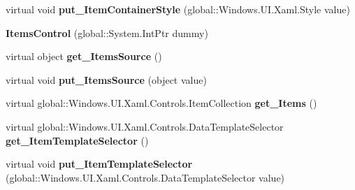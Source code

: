 \begin{DoxyCompactItemize}
\item 
\mbox{\label{class_windows_1_1_u_i_1_1_xaml_1_1_controls_1_1_items_control_a22e6b11c11e2306e3c13c1294b698d47}} 
virtual void {\bfseries put\+\_\+\+Item\+Container\+Style} (global\+::\+Windows.\+U\+I.\+Xaml.\+Style value)
\item 
\mbox{\label{class_windows_1_1_u_i_1_1_xaml_1_1_controls_1_1_items_control_a2a23be568a479e115892800d6b88b77a}} 
{\bfseries Items\+Control} (global\+::\+System.\+Int\+Ptr dummy)
\item 
\mbox{\label{class_windows_1_1_u_i_1_1_xaml_1_1_controls_1_1_items_control_ada6978b5b6da9e42647e7bbae2efa4d9}} 
virtual object {\bfseries get\+\_\+\+Items\+Source} ()
\item 
\mbox{\label{class_windows_1_1_u_i_1_1_xaml_1_1_controls_1_1_items_control_aeea26f9c774f2e66be28cffd70420e8c}} 
virtual void {\bfseries put\+\_\+\+Items\+Source} (object value)
\item 
\mbox{\label{class_windows_1_1_u_i_1_1_xaml_1_1_controls_1_1_items_control_a5f5a8f9fc3aafc90d6f7e7ad33f58698}} 
virtual global\+::\+Windows.\+U\+I.\+Xaml.\+Controls.\+Item\+Collection {\bfseries get\+\_\+\+Items} ()
\item 
\mbox{\label{class_windows_1_1_u_i_1_1_xaml_1_1_controls_1_1_items_control_a9959b8e62f370e00b7c5ba03c1735a6c}} 
virtual global\+::\+Windows.\+U\+I.\+Xaml.\+Controls.\+Data\+Template\+Selector {\bfseries get\+\_\+\+Item\+Template\+Selector} ()
\item 
\mbox{\label{class_windows_1_1_u_i_1_1_xaml_1_1_controls_1_1_items_control_aa9c0c0db76f9d77b78c08b022e500e90}} 
virtual void {\bfseries put\+\_\+\+Item\+Template\+Selector} (global\+::\+Windows.\+U\+I.\+Xaml.\+Controls.\+Data\+Template\+Selector value)
\item 
\mbox{\label{class_windows_1_1_u_i_1_1_xaml_1_1_controls_1_1_items_control_a54332e55a6fbe6987c21c07fe342a9e2}} 

\end{DoxyCompactItemize}
